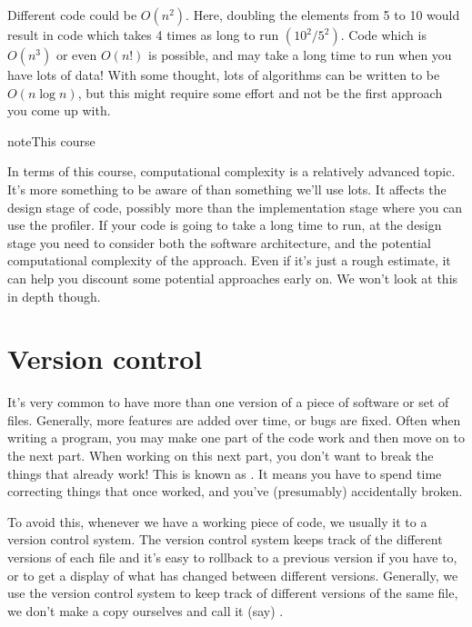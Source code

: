 \documentclass[letterpaper,10pt,british]{sphinxmanual}
\begin{document}
\sphinxAtStartPar
Different code could be \(O(n^2)\). Here, doubling the elements from 5 to 10 would result in code which takes 4 times as long to run \((10^2/5^2)\). Code which is \(O(n^3)\) or even \(O(n!)\) is possible, and may take a long time to run when you have lots of data! With some thought, lots of algorithms can be written to be \(O(n \log n)\), but this might require some effort and not be the first approach you come up with.

\begin{sphinxadmonition}{note}{This course}

\sphinxAtStartPar
In terms of this course, computational complexity is a relatively advanced topic. It’s more something to be aware of than something we’ll use lots. It affects the design stage of code, possibly more than the implementation stage where you can use the profiler. If your code is going to take a long time to run, at the design stage you need to consider both the software architecture, and the potential computational complexity of the approach. Even if it’s just a rough estimate, it can help you discount some potential approaches early on. We won’t look at this in depth though.
\end{sphinxadmonition}

\sphinxstepscope


\section{Version control}
\label{\detokenize{chapters/software_development_tools/version_control:version-control}}\label{\detokenize{chapters/software_development_tools/version_control:id1}}\label{\detokenize{chapters/software_development_tools/version_control::doc}}
\sphinxAtStartPar
It’s very common to have more than one version of a piece of software or set of files. Generally, more features are added over time, or bugs are fixed. Often when writing a program, you may make one part of the code work and then move on to the next part. When working on this next part, you don’t want to break the things that already work! This is known as . It means you have to spend time correcting things that once worked, and you’ve (presumably) accidentally broken.

\sphinxAtStartPar
To avoid this, whenever we have a working piece of code, we usually  it to a version control system. The version control system keeps track of the different versions of each file and it’s easy to roll\sphinxhyphen{}back to a previous version if you have to, or to get a display of what has changed between different versions. Generally, we use the version control system to keep track of different versions of the same file, we don’t make a copy ourselves and call it (say) .
\end{document}
